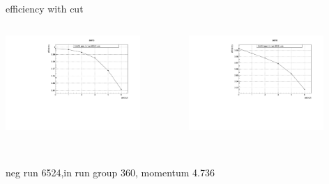 \documentclass[aspectratio=169,xcolor=dvipsnames]{beamer}
\begin{document}
\begin{frame}{efficiency with cut}
  \begin{columns}
    \begin{column}[T]{0.5\textwidth}
  \includegraphics[width = 0.8\textwidth]{results/pid/SHMS_aero_6524.pdf}
\end{column}
\begin{column}[T]{0.5\textwidth}
  \includegraphics[width = 0.8\textwidth]{results/pid/SHMS_aero_6518.pdf}
\end{column}
\end{columns}
  \\
   neg run 6524,in run group 360, momentum 4.736
 
\end{frame}
\end{document}
